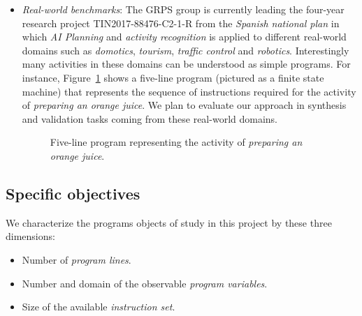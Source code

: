 \documentclass[10pt,a4paper]{paper}
\begin{document}
\begin{itemize}
  
\item {\em Real-world benchmarks}: The GRPS group is currently leading the four-year research project TIN2017-88476-C2-1-R from the {\em Spanish national plan} in which {\em AI Planning} and {\em activity recognition} is applied to different real-world domains such as {\em domotics}, {\em tourism}, {\em traffic control} and {\em robotics}. Interestingly many activities in these domains can be understood as simple programs. For instance, Figure~\ref{fig:activity} shows a five-line program (pictured as a finite state machine) that represents the sequence of instructions required for the activity of {\em preparing an orange juice}. We plan to evaluate our approach in synthesis and validation tasks coming from these real-world domains. 

\begin{figure}[hbt!]
  \begin{center}
\end{center}
\caption{\small Five-line program representing the activity of {\em preparing an orange juice}.}
\label{fig:activity}
\end{figure}
\end{itemize}



\subsection{Specific objectives}
\label{sec:objectivos}
We characterize the programs objects of study in this project by these three dimensions:
\begin{itemize}
\item Number of {\em program lines}.
\item Number and domain of the observable {\em program variables}.
\item Size of the available {\em instruction set}.
\end{itemize}  
\end{document}
